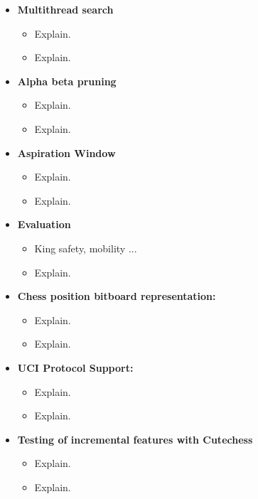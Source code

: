 \begin{itemize}

    \item \textbf{Multithread search}
    \begin{itemize}
        \item Explain.
        \item Explain.
    \end{itemize}
    
    \item \textbf{Alpha beta pruning}
    \begin{itemize}
        \item Explain.
        \item Explain.
    \end{itemize}

    \item \textbf{Aspiration Window}
    \begin{itemize}
        \item Explain.
        \item Explain.
    \end{itemize}

    \item \textbf{Evaluation}
    \begin{itemize}
        \item King safety, mobility ... 
        \item Explain.
    \end{itemize}

    \item \textbf{Chess position bitboard representation:}
    \begin{itemize}
        \item Explain.
        \item Explain.
    \end{itemize}

    \item \textbf{UCI Protocol Support:}
    \begin{itemize}
        \item Explain.
        \item Explain.
    \end{itemize}
  
    \item \textbf{Testing of incremental features with Cutechess}
    \begin{itemize}
        \item Explain.
        \item Explain.
    \end{itemize}


\end{itemize}
